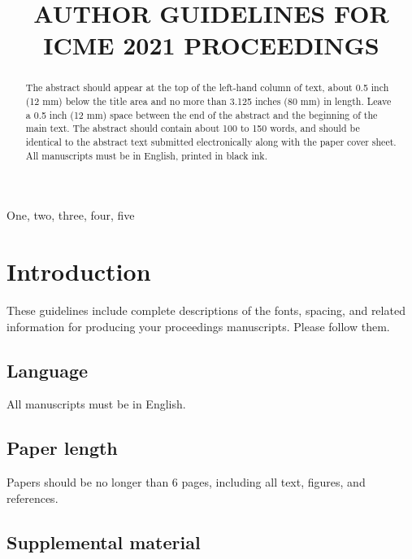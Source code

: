\documentclass{article}
\begin{document}
\sloppy

\def\x{{\mathbf x}}
\def\L{{\cal L}}


\title{AUTHOR GUIDELINES FOR ICME 2021 PROCEEDINGS}
%
\address{}


\maketitle


%
\begin{abstract}
The abstract should appear at the top of the left-hand column of text, about 0.5 inch (12 mm) below the title area and no more than 3.125 inches (80 mm) in length.  Leave a 0.5 inch (12 mm) space between the end of the abstract and the beginning of the main text.  The abstract should contain about 100 to 150 words, and should be identical to the abstract text submitted electronically along with the paper cover sheet.  All manuscripts must be in English, printed in black ink.
\end{abstract}
%
\begin{keywords}
One, two, three, four, five
\end{keywords}
%
\section{Introduction}
\label{sec:intro}

These guidelines include complete descriptions of the fonts, spacing, and related information for producing your proceedings manuscripts. Please follow them. 

\subsection{Language}

All manuscripts must be in English.

\subsection{Paper length}

Papers should be no longer than 6 pages, including all text, figures, and references.

\subsection{Supplemental material}
\end{document}
